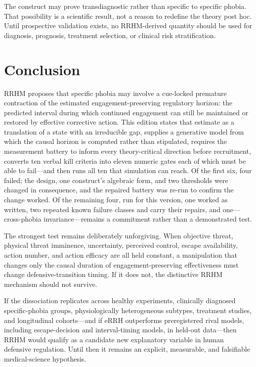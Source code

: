 \documentclass[9pt,twocolumn]{article}
\begin{document}
The construct may prove transdiagnostic rather than specific to specific phobia. That possibility is a scientific result, not a reason to redefine the theory post hoc. Until prospective validation exists, no RRHM-derived quantity should be used for diagnosis, prognosis, treatment selection, or clinical risk stratification.

\section{Conclusion}
RRHM proposes that specific phobia may involve a cue-locked premature contraction of the estimated engagement-preserving regulatory horizon: the predicted interval during which continued engagement can still be maintained or restored by effective corrective action. This edition states that estimate as a translation of a state with an irreducible gap, supplies a generative model from which the causal horizon is computed rather than stipulated, requires the measurement battery to inform every theory-critical direction before recruitment, converts ten verbal kill criteria into eleven numeric gates each of which must be able to fail---and then runs all ten that simulation can reach. Of the first six, four failed; the design, one construct's algebraic form, and two thresholds were changed in consequence, and the repaired battery was re-run to confirm the change worked. Of the remaining four, run for this version, one worked as written, two repeated known failure classes and carry their repairs, and one---cross-phobia invariance---remains a commitment rather than a demonstrated test.

The strongest test remains deliberately unforgiving. When objective threat, physical threat imminence, uncertainty, perceived control, escape availability, action number, and action efficacy are all held constant, a manipulation that changes only the causal duration of engagement-preserving effectiveness must change defensive-transition timing. If it does not, the distinctive RRHM mechanism should not survive.

If the dissociation replicates across healthy experiments, clinically diagnosed specific-phobia groups, physiologically heterogeneous subtypes, treatment studies, and longitudinal cohorts---and if eRRH outperforms preregistered rival models, including escape-decision and interval-timing models, in held-out data---then RRHM would qualify as a candidate new explanatory variable in human defensive regulation. Until then it remains an explicit, measurable, and falsifiable medical-science hypothesis.
\end{document}
